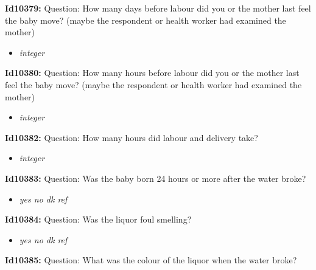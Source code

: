 \documentclass{article}%
\begin{document}
\textbf{Id10379: \newline%
}%
Question: How many days before labour did you or the mother last feel the baby move? (maybe the respondent or health worker had examined the mother)\newline%
%
\begin{itemize}%
\item%
\textit{integer\newline%
}%
\end{itemize}%
\textbf{Id10380: \newline%
}%
Question: How many hours before labour did you or the mother last feel the baby move? (maybe the respondent or health worker had examined the mother)\newline%
%
\begin{itemize}%
\item%
\textit{integer\newline%
}%
\end{itemize}%
\textbf{Id10382: \newline%
}%
Question: How many hours did labour and delivery take?\newline%
%
\begin{itemize}%
\item%
\textit{integer\newline%
}%
\end{itemize}%
\textbf{Id10383: \newline%
}%
Question: Was the baby born 24 hours or more after the water broke?\newline%
%
\begin{itemize}%
\item%
\textit{yes\newline%
 no\newline%
 dk\newline%
 ref\newline%
}%
\end{itemize}%
\textbf{Id10384: \newline%
}%
Question: Was the liquor foul smelling?\newline%
%
\begin{itemize}%
\item%
\textit{yes\newline%
 no\newline%
 dk\newline%
 ref\newline%
}%
\end{itemize}%
\textbf{Id10385: \newline%
}%
Question: What was the colour of the liquor when the water broke?\newline%
\end{document}
